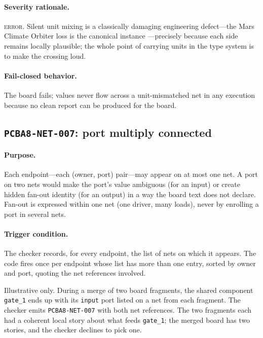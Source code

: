 \paragraph{Severity rationale.} \textsc{error}. Silent unit mixing is a classically damaging engineering defect---the Mars Climate Orbiter loss is the canonical instance \cite{mco}---precisely because each side remains locally plausible; the whole point of carrying units in the type system is to make the crossing loud.

\paragraph{Fail-closed behavior.} The board fails; values never flow across a unit-mismatched net in any execution because no clean report can be produced for the board.

\subsection{\texttt{PCBA8-NET-007}: port multiply connected}\label{ch07:sub:net007}

\paragraph{Purpose.} Each endpoint---each (owner, port) pair---may appear on at most one net. A port on two nets would make the port's value ambiguous (for an input) or create hidden fan-out identity (for an output) in a way the board text does not declare. Fan-out is expressed within one net (one driver, many loads), never by enrolling a port in several nets.

\paragraph{Trigger condition.} The checker records, for every endpoint, the list of nets on which it appears. The code fires once per endpoint whose list has more than one entry, sorted by owner and port, quoting the net references involved.

\begin{example}\label{ch07:ex:net007}
Illustrative only. During a merge of two board fragments, the shared component \texttt{gate\_1} ends up with its \texttt{input} port listed on a net from each fragment. The checker emits \texttt{PCBA8-NET-007} with both net references. The two fragments each had a coherent local story about what feeds \texttt{gate\_1}; the merged board has two stories, and the checker declines to pick one.
\end{example}

